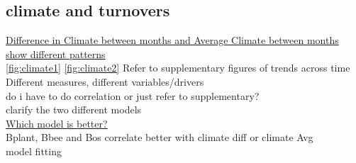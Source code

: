 \documentclass[11pt]{article}
\begin{document}
\begin{figure}[H]
  \label{fig:plant-bee}
\end{figure}

\subsection{climate and turnovers}
\underline{Difference in Climate between months and Average Climate between months show different patterns}\\ \autoref{fig:climate1} \autoref{fig:climate2} Refer to supplementary figures of trends across time \\
Different measures, different variables/drivers\\
do i have to do correlation or just refer to supplementary? \\
clarify the two different models \\ 

\newpage
\underline{Which model is better?} \\
Bplant, Bbee and Bos correlate better with climate diff or climate Avg \\
model fitting \\

%
%
%
\end{document}
